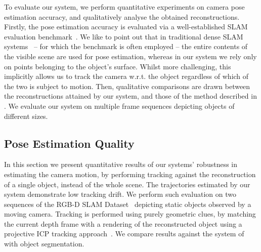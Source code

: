 To evaluate our system, we perform quantitative experiments on camera pose estimation accuracy, and qualitatively analyse the obtained reconstructions.
Firstly, the pose estimation accuracy is evaluated via a well-established SLAM evaluation benchmark~\cite{sturm12iros}.
We like to point out that %
in traditional dense SLAM systems~\cite{Prisacariu2014,Niessner2013,Newcombe2011} -- for which the benchmark is often employed -- the entire contents of the visible scene are used for pose estimation, whereas in our system we rely only on points belonging to the object's surface.
Whilst more challenging, this implicitly allows us to track the camera w.r.t. the object regardless of which of the two is subject to motion.
Then, qualitative comparisons are drawn between the reconstructions attained by our system, and those of the method described in \cite{Ren2013}.
We evaluate our system on multiple frame sequences depicting objects of different sizes. %


\subsection{Pose Estimation Quality}
In this section we present quantitative results of our systems' %
robustness in estimating the camera motion, by performing tracking against the reconstruction of a single object, instead of the whole scene.
The trajectories estimated by our system demonstrate low tracking drift. %
We perform such evaluation on two sequences of the RGB-D SLAM Dataset~\cite{sturm12iros} depicting static objects observed by a moving camera.
Tracking is performed using purely geometric clues, by matching the current depth frame with a rendering of the reconstructed object using a projective ICP tracking approach~\cite{Kahler2016}. We compare results against the system of \cite{Prisacariu2014} with object segmentation.

